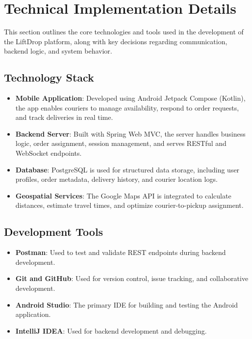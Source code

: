 \section{Technical Implementation Details}

This section outlines the core technologies and tools used in the development of the LiftDrop platform, along with key decisions regarding communication, backend logic, and system behavior.

\subsection{Technology Stack}

\begin{itemize}
    \item \textbf{Mobile Application}: Developed using Android Jetpack Compose (Kotlin), the app enables couriers to manage availability, respond to order requests, and track deliveries in real time.
    \item \textbf{Backend Server}: Built with Spring Web MVC, the server handles business logic, order assignment, session management, and serves RESTful and WebSocket endpoints.
    \item \textbf{Database}: PostgreSQL is used for structured data storage, including user profiles, order metadata, delivery history, and courier location logs.
    \item \textbf{Geospatial Services}: The Google Maps API is integrated to calculate distances, estimate travel times, and optimize courier-to-pickup assignment.
\end{itemize}

\subsection{Development Tools}

\begin{itemize}
    \item \textbf{Postman}: Used to test and validate REST endpoints during backend development.
    \item \textbf{Git and GitHub}: Used for version control, issue tracking, and collaborative development.
    \item \textbf{Android Studio}: The primary IDE for building and testing the Android application.
    \item \textbf{IntelliJ IDEA}: Used for backend development and debugging.
\end{itemize}

